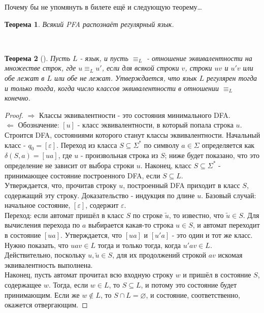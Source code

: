 \documentclass[a4paper]{article}
\theoremstyle{indented}
\newtheorem{theorem}{Теорема}
\theoremstyle{definition}
\theoremstyle{remark}
\DeclareMathOperator{\La}{\Leftarrow}
\DeclareMathOperator{\Ra}{\Rightarrow}
\begin{document}
Почему бы не упомянуть в билете ещё и следующую теорему\dots \\ 

\begin{theorem}
    Всякий PFA распознаёт регулярный язык.
\end{theorem} \ 

\begin{theorem}[]
    Пусть $L$ - язык, и пусть $\equiv_L$ - отношение эквивалентности на множестве строк, где $u \equiv_L u'$, если для всякой строки $v$, строки $uv$ и $u'v$ или обе лежат в $L$ или обе не лежат. Утверждается, что язык $L$ регулярен тогда и только тогда, когда число классов эквивалентности в отношении $\equiv_L$ конечно.
\end{theorem}

\begin{proof}
    $\Ra$ Классы эквивалентности - это состояния минимального DFA. \\ 

    $\La$ Обозначение: $[u]$ - класс эквивалентности, в который попала строка $u$. \\ 

    Строится DFA, состояниями которого станут классы эквивалентности. Начальный класс - $q_0 = [\varepsilon]$. Переход из класса $S \subseteq \Sigma^*$ по символу $a \in \Sigma$ определяется как $\delta(S,a) = [ua]$, где $u$ - произвольная строка из $S$; ниже будет показано, что это определение не зависит от выбора строки $u$. Наконец, класс $S \subseteq \Sigma^*$ - принимающее состояние построенного DFA, если $S \subseteq L$. \\ 

    Утверждается, что, прочитав строку $u$, построенный DFA приходит в класс $S$, содержащий эту строку. Доказательство - индукция по длине $u$. Базовый случай: начальное состояние, $[\varepsilon]$, содержит $\varepsilon$. \\ 

    Переход: если автомат пришёл в класс $S$ по строке $\widetilde{u}$, то известно, что $\widetilde{u} \in S$. Для вычисления перехода по $a$ выбирается какая-то строка $u \in S$, и автомат переходит в состояние $[ua]$. Утверждается, что $[ua]$ и $[u'a]$ - это один и тот же класс. Нужно показать, что $uav \in L$ тогда и только тогда, когда $u'av \in L$. Действительно, поскольку $u, \widetilde{u} \in S$, для их продолжений строкой $av$ искомая эквивалентность выполнена. \\ 

    Наконец, пусть автомат прочитал всю входную строку $w$ и пришёл в состояние $S$, содержащее $w$. Тогда, если $w \in L$, то $S \subseteq L$, и потому это состояние будет принимающим. Если же $w \notin L$, то $S \cap L = \varnothing$, и состояние, соответственно, окажется отвергающим. 
\end{proof}
\end{document}
